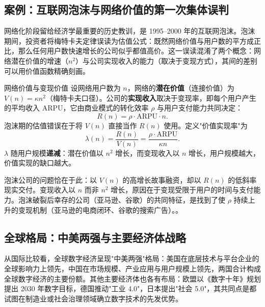 \subsection{案例：互联网泡沫与网络价值的第一次集体误判}

网络化阶段留给经济学最重要的历史教训，是 1995--2000 年的互联网泡沫。泡沫期间，投资者将梅特卡夫定律误读为估值公式：既然网络价值与用户数的平方成正比，那么任何用户数快速增长的公司似乎都值高价。这一误读混淆了两个概念：网络潜在价值的增速（$n^2$）与公司实现收入的能力（取决于变现方式），其间的差别可以用价值函数精确刻画。

\begin{derivation}{网络价值与变现价值}{}
设网络用户数为 $n$，网络的\textbf{潜在价值}（连接价值）为 $V(n) = \kappa n^2$（梅特卡夫口径）。公司的\textbf{实现收入}取决于变现率，即每个用户产生的平均收入 $\mathrm{ARPU}$，它由商业模式的转化效率 $\rho$ 与用户支付能力共同决定：
\[
R(n) = \rho \cdot \mathrm{ARPU} \cdot n.
\]
泡沫期的估值错误在于将 $V(n)$ 直接当作 $R(n)$ 使用。定义"价值实现率"为
\[
\lambda(n) = \frac{R(n)}{V(n)} = \frac{\rho \cdot \mathrm{ARPU}}{\kappa n}.
\]
$\lambda$ 随用户规模\textbf{递减}：潜在价值以 $n^2$ 增长，而变现收入以 $n$ 增长，用户规模越大，价值实现的缺口越大。
\end{derivation}

泡沫公司的问题恰在于此：以 $V(n)$ 的高增长故事融资，却以 $R(n)$ 的低斜率现实交付。变现收入以 $n$ 而非 $n^2$ 增长，原因在于变现受限于用户的时间与支付能力。泡沫破裂后幸存的公司（亚马逊、谷歌）的共同特征，是找到了使 $\rho$ 持续上升的变现机制（亚马逊的电商闭环、谷歌的搜索广告）。。

\subsection{全球格局：中美两强与主要经济体战略}

从国际比较看，全球数字经济呈现"中美两强"格局：美国在底层技术与平台企业的全球影响力上领先，中国在市场规模、产业应用与用户规模上领先，两国合计构成全球数字经济的主要份额。其他主要经济体也各有布局：欧盟以《数字十年》规划提出 2030 年数字目标，德国推动"工业 4.0"，日本提出"社会 5.0"，其共同点是都试图在制造业或社会治理领域确立数字技术的先发优势。

